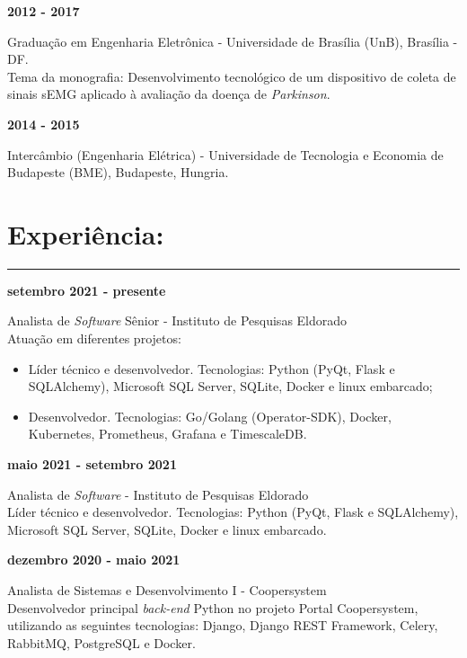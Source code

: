 \documentclass[11pt]{article}
\begin{document}
\textbf{2012 - 2017}
\begin{addmargin}{0.5cm}
Graduação em Engenharia Eletrônica - Universidade de Brasília (UnB), Brasília - DF. \\
Tema da monografia: Desenvolvimento tecnológico de um dispositivo de coleta
de sinais sEMG aplicado à avaliação da doença de \textit{Parkinson}.\\
\end{addmargin}

\textbf{2014 - 2015} 
\begin{addmargin}{0.5cm}
Intercâmbio (Engenharia Elétrica) - Universidade de Tecnologia e Economia de Budapeste (BME), Budapeste, Hungria. 
\end{addmargin}

\section{Experiência:}
\hrule \vspace{0.1cm}

\textbf{setembro 2021 - presente}
\begin{addmargin}{0.5cm}
Analista de \textit{Software} Sênior - Instituto de Pesquisas Eldorado \\
Atuação em diferentes projetos:
\begin{itemize}
    \item Líder técnico e desenvolvedor. Tecnologias: Python (PyQt, Flask e SQLAlchemy), Microsoft SQL Server, SQLite, Docker e linux embarcado;
    \item Desenvolvedor. Tecnologias: Go/Golang (Operator-SDK), Docker, Kubernetes, Prometheus, Grafana e TimescaleDB. \\
\end{itemize}
\end{addmargin}

\newpage
\textbf{maio 2021 - setembro 2021}
\begin{addmargin}{0.5cm}
Analista de \textit{Software} - Instituto de Pesquisas Eldorado \\
Líder técnico e desenvolvedor. Tecnologias: Python (PyQt, Flask e SQLAlchemy), Microsoft SQL Server, SQLite, Docker e linux embarcado.\\
\end{addmargin}


\textbf{dezembro 2020 - maio 2021}
\begin{addmargin}{0.5cm}
    Analista de Sistemas e Desenvolvimento I - Coopersystem \\
    Desenvolvedor principal \textit{back-end} Python no projeto Portal Coopersystem,
    utilizando as seguintes tecnologias: Django, Django REST Framework, Celery, 
    RabbitMQ, PostgreSQL e Docker.\\
\end{addmargin}
\end{document}
